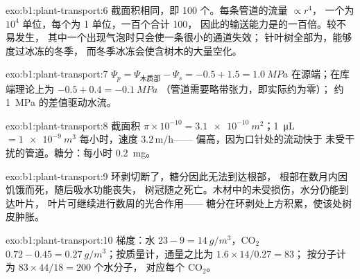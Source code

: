\begin{solution}{exo:b1:plant-transport:6}
截面积相同，即 100 个。每条管道的流量 $\propto r^4$，
一个为 $10^4$ 单位，每个为 1 单位，一百个合计 100，
因此的输送能力是的一百倍。较不易发生，
其中一个出现气泡时只会使一条很小的通道失效；
针叶树全部为，能够度过冰冻的冬季，
而冬季冰冻会使含树木的大量空化。
\end{solution}

\begin{solution}{exo:b1:plant-transport:7}
$\Psi_p = \Psi_{\text{木质部}} - \Psi_s = -0.5 + 1.5 = \qty{1.0}{MPa}$
在源端；在库端理论上为 $-0.5 + 0.4 = \qty{-0.1}{MPa}$
（管道需要略带张力，即实际约为零）；
约 \qty{1}{MPa} 的差值驱动水流。
\end{solution}

\begin{solution}{exo:b1:plant-transport:8}
截面积 $\pi\times 10^{-10} = \qty{3.1e-10}{m^2}$；\qty{1}{\micro L}
$= \qty{1e-9}{m^3}$ 每小时，速度 $3.2\,\mathrm{m/h}$——
偏高，因为口针处的流动快于
未受干扰的管道。糖分：每小时 \qty{0.2}{mg}。
\end{solution}

\begin{solution}{exo:b1:plant-transport:9}
环剥切断了，糖分因此无法到达根部，
根部在数月内因饥饿而死，随后吸水功能丧失，
树冠随之死亡。木材中的未受损伤，水分仍能到达叶片，
叶片可继续进行数周的光合作用——
糖分在环剥处上方积累，使该处树皮肿胀。
\end{solution}

\begin{solution}{exo:b1:plant-transport:10}
梯度：水 $23 - 9 = \qty{14}{g/m^3}$，$\mathrm{CO_2}$ $0.72 -
0.45 = \qty{0.27}{g/m^3}$；按质量计，通量之比为 $1.6\times 14/0.27 = 83$；
按分子计为 $83\times 44/18 = 200$ 个水分子，
对应每个 $\mathrm{CO_2}$。
\end{solution}

